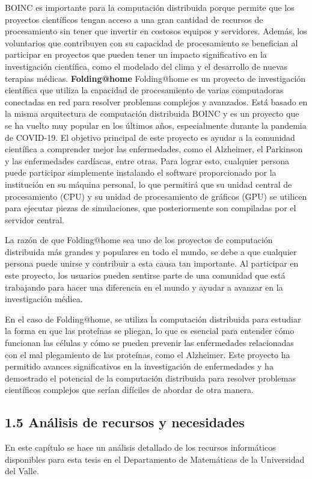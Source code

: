 \begin{doublespace}
\begin{multicols}{2}
  BOINC es importante para la computación distribuida porque permite que los proyectos científicos tengan acceso a una gran cantidad de recursos de procesamiento sin tener que invertir en costosos equipos y servidores. Además, los voluntarios que contribuyen con su capacidad de procesamiento se benefician al participar en proyectos que pueden tener un impacto significativo en la investigación científica, como el modelado del clima y el desarrollo de nuevas terapias médicas.\cite{BOINC-1}
  \newpage
  \textbf{Folding@home}
  \newline
  Folding@home es un proyecto de investigación científica que utiliza la capacidad de procesamiento de varias computadoras conectadas en red para resolver problemas complejos y avanzados. Está basado en la misma arquitectura de computación distribuida BOINC y es un proyecto que se ha vuelto muy popular en los últimos años, especialmente durante la pandemia de COVID-19. El objetivo principal de este proyecto es ayudar a la comunidad científica a comprender mejor las enfermedades, como el Alzheimer, el Parkinson y las enfermedades cardíacas, entre otras. Para lograr esto, cualquier persona puede participar simplemente instalando el software proporcionado por la institución en su máquina personal, lo que permitirá que su unidad central de procesamiento (CPU) y su unidad de procesamiento de gráficos (GPU) se utilicen para ejecutar piezas de simulaciones, que posteriormente son compiladas por el servidor central.

  La razón de que Folding@home sea uno de los proyectos de computación distribuida más grandes y populares en todo el mundo, se debe a que cualquier persona puede unirse y contribuir a esta causa tan importante. Al participar en este proyecto, los usuarios pueden sentirse parte de una comunidad que está trabajando para hacer una diferencia en el mundo y ayudar a avanzar en la investigación médica.

  En el caso de Folding@home, se utiliza la computación distribuida para estudiar la forma en que las proteínas se pliegan, lo que es esencial para entender cómo funcionan las células y cómo se pueden prevenir las enfermedades relacionadas con el mal plegamiento de las proteínas, como el Alzheimer. Este proyecto ha permitido avances significativos en la investigación de enfermedades y ha demostrado el potencial de la computación distribuida para resolver problemas científicos complejos que serían difíciles de abordar de otra manera.\cite{Folding@home-1}
  \subsection{1.5 Análisis de recursos y necesidades}
  En este capítulo se hace un análisis detallado de los recursos informáticos disponibles para esta tesis en el Departamento de Matemáticas de la Universidad del Valle.


\end{multicols}
\end{doublespace}
